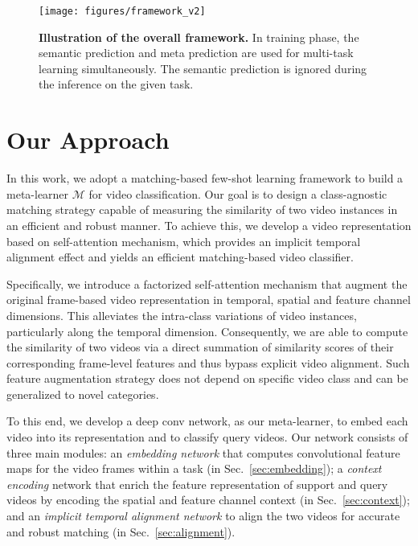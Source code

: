 \documentclass{article}
\begin{document}
\begin{figure*}
    \centering
    \texttt{[image: figures/framework\_v2]}
\caption{\textbf{Illustration of the overall framework.} In training phase, the semantic prediction and meta prediction are used for multi-task learning simultaneously. The semantic prediction is ignored during the inference on the given task. }\vspace{-3mm}
    \label{fig:overview}
\end{figure*}


\section{Our Approach}\label{sec:method}
In this work, we adopt a matching-based few-shot learning framework to build a meta-learner $\mathcal{M}$ for video classification. Our goal is to design a class-agnostic matching strategy capable of measuring the similarity of two video instances in an efficient and robust manner. To achieve this, we develop a video representation based on self-attention mechanism, which provides an implicit temporal alignment effect and yields an efficient matching-based video classifier. 

Specifically, we introduce a factorized self-attention mechanism that augment the original frame-based video representation in temporal, spatial and feature channel dimensions. This alleviates the intra-class variations of video instances, particularly along the temporal dimension. Consequently, we are able to compute the similarity of two videos via a direct summation of similarity scores of their corresponding frame-level features and thus bypass explicit video alignment. Such feature augmentation strategy does not depend on specific video class and can be generalized to novel categories.   



To this end, we develop a deep conv network, as our meta-learner, to embed each video into its representation and to classify query videos. 
Our network consists of three main modules: an \textit{embedding network} that computes convolutional feature maps for the video frames within a task (in Sec.~\ref{sec:embedding}); a \textit{context encoding} network that enrich the feature representation of support and query videos by encoding the spatial and feature channel context (in Sec.~\ref{sec:context}); and an \textit{implicit temporal alignment network} to align the two videos for accurate and robust matching (in Sec.~\ref{sec:alignment}).
\end{document}
